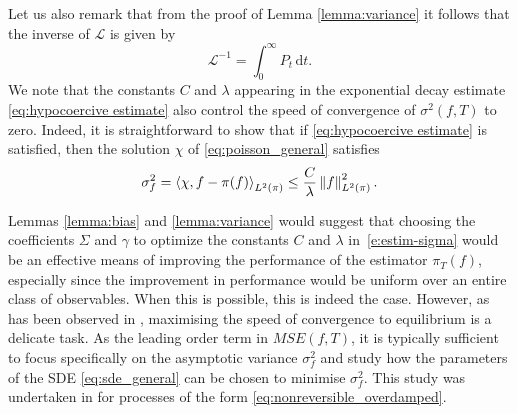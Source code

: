 Let us also remark that from the proof of Lemma \ref{lemma:variance} it follows that the inverse of $\mathcal{L}$ is given by
\begin{equation}
\mathcal{L}^{-1}=\int_0^{\infty}P_t \,\mathrm{d}t.
\end{equation}
We note that the constants $C$ and $\lambda$ appearing in the exponential decay estimate \eqref{eq:hypocoercive estimate} also control the speed of convergence of $\sigma^2(f, T)$ to zero.  Indeed, it is straightforward to show that if \eqref{eq:hypocoercive estimate} is satisfied, then the solution $\chi$ of \eqref{eq:poisson_general} satisfies
\begin{equation}\label{e:estim-sigma}
  \sigma^2_{f} = \left\langle \chi, f-\pi(f) \right\rangle_{L^2(\pi)} \leq \frac{C}{\lambda}\left\lVert{f}\right\rVert^2_{L^2(\pi)}.
\end{equation}

Lemmas \ref{lemma:bias} and \ref{lemma:variance} would suggest that choosing the coefficients $\Sigma$ and $\gamma$ to optimize the constants $C$ and $\lambda$ in~\eqref{e:estim-sigma} would be an effective means of improving the performance of the estimator $\pi_T(f)$, especially since the improvement in performance would be uniform over an entire class of observables.  When this is possible, this is indeed the case. However, as has been observed in \cite{LelievreNierPavliotis2013,Hwang1993,Hwang2005}, maximising the speed of convergence to equilibrium is a delicate task.  As the leading order term in $MSE(f, T)$, it is typically sufficient to focus specifically on the asymptotic variance $\sigma^2_{f}$ and study how the parameters of the SDE \eqref{eq:sde_general} can be chosen to minimise $\sigma^2_{f}$. This study was undertaken in \cite{duncan2016variance} for processes of the form \eqref{eq:nonreversible_overdamped}.
